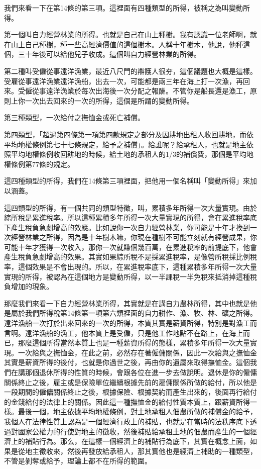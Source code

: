 \documentclass[oneside,sub3section]{ctexbook}
\begin{document}
我們來看一下在第14條的第三項。這裡面有四種類型的所得，被稱之為叫變動所得。

第一個叫自力經營林業的所得。也就是自己在山上種樹。我有認識一位老師啊，就在山上自己種樹，種一些高經濟價值的這個樹木。人稱十年樹木，他說，他種這個，三十年後可以給他兒子收成。這個叫自力經營林業的所得。

第二種叫受僱從事遠洋漁業，最近八尺門的辯護人很夯，這個議題也大概是這樣。受雇從事遠洋漁業遠洋漁船，出去一次，可能都是兩三年在海上打一次漁，再回來。受僱從事遠洋漁業於每次出海後一次分配之報酬。不管你是船長還是漁工，原則上你一次出去回來的一次的所得，這個是所謂的變動所得。

第三種類型，一次給付之撫恤金或死亡補償。

第四類型，「超過第四條第一項第四款規定之部分及因耕地出租人收回耕地，而依平均地權條例第七十七條規定，給予之補償」。給誰呢？給承租人，也就是地主依照平均地權條例收回耕地的時候，給土地的承租人的1/3的補償費，那個是平均地權條例第77條的規定。

這四種類型的所得，我們在14條第三項裡面，把他用一個名稱叫「變動所得」來加以涵蓋。

這四類型的所得，有一個共同的類型特徵，叫，累積多年所得一次大量實現。由於綜所稅是累進稅率。所以這種累積多年所得一次大量實現的所得，會在累進稅率底下產生稅負急劇增高的效應。比如說你一次自力經營林業，你可能是十年才換到一次經營林業之所得，因為是十年樹木嘛，你現在種樹不可能立刻就有經營成果，你可能十年才獲得一次收入，那你一次就賺個幾百萬，在累進稅率的前提底下，他會產生稅負急劇增高的效果。其實如果綜所稅不是採累進稅率，是像營所稅採比例稅率，這個效果是不會出現的。所以，在累進稅率底下，這種累積多年所得一次大量實現的所得，被認為在這個地方是變動所得，以一半課稅一半免稅來抵消掉這種稅負增加的現象。

那麼我們來看一下自力經營林業所得，其實就是在講自力農林所得，其中也就是他是屬於我們所得稅第14條第一項第六類裡面的自力耕作、漁、牧、林、礦之所得。遠洋漁船一次打於出來回來的一次的所得，本質其實是薪資所得，特別是對漁工而言啊。遠洋漁船的漁工，他本質上是受僱，只是他工作地點不在路上，在海上而已，那麼這個所得當然本質上也是一種薪資所得的態樣，累積多年所得一次大量實現。一次給與之撫恤金，在此之前，必然存在著僱傭關係，因此一次給與之撫恤金其實是薪資所得的後付，也就是你過世之後，再由你的遺屬來取得撫恤金。這個我們在講那個退休所得的性質的時候，會跟各位在進一步去做說明。退休是你的僱傭關係終止之後，雇主或是保險單位繼續根據先前的雇傭關係所做的給付，所以他是一段期間的僱傭關係終止之後，根據保險、根據契約而產生出來的，後面再行給付的金錢給付的法律上的關係。因此這一種撫恤金的給付性質本質上，跟薪資所得一樣。最後一個，地主依據平均地權條例，對土地承租人佃農所做的補償金的給予，我個人在法律性質上認為是一個經濟行政上的補貼，也就是在當時的法秩序底下透過對國家公權力的行使對地主的徵收，然後補貼給承租土地的佃農而產生的一個經濟上的補貼行為。那么，在這樣一個經濟上的補貼行為底下，其實在概念上面，如果是從地主徵收來，然後再發放給承租人，那其實他也是經濟上補助的一種類型，不管是剝奪或給予，理論上都不在所得的範圍。
\end{document}
